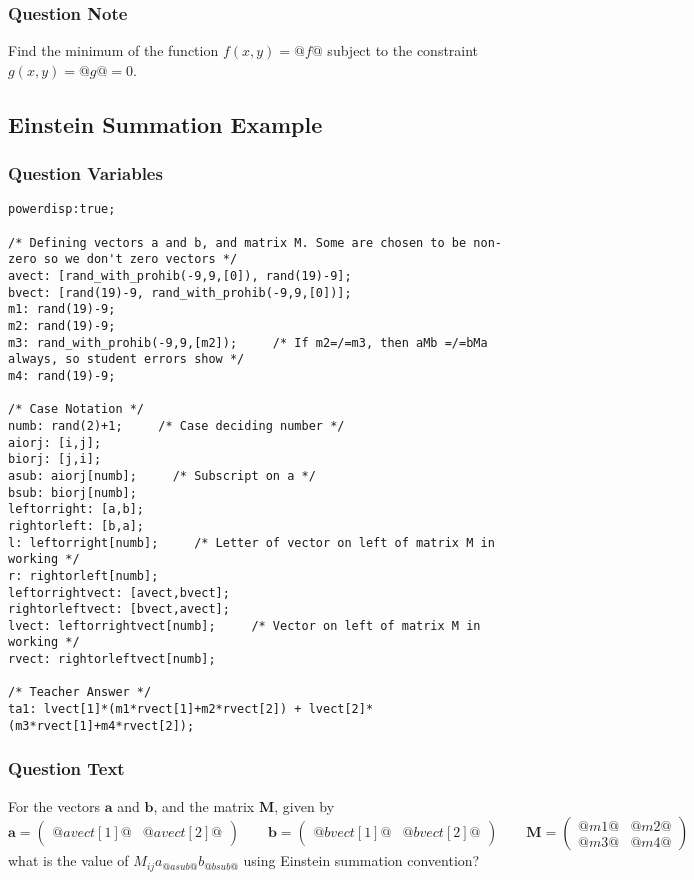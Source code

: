 \documentclass[a4paper,10pt]{article}
\begin{document}
\subsubsection{Question Note}
Find the minimum of the function \(f(x,y) = @f@\) subject to the constraint \(g(x,y) = @g@ = 0\).

\subsection{Einstein Summation Example}
\subsubsection{Question Variables}
\begin{lstlisting}
powerdisp:true;

/* Defining vectors a and b, and matrix M. Some are chosen to be non-zero so we don't zero vectors */
avect: [rand_with_prohib(-9,9,[0]), rand(19)-9];
bvect: [rand(19)-9, rand_with_prohib(-9,9,[0])];
m1: rand(19)-9;
m2: rand(19)-9;
m3: rand_with_prohib(-9,9,[m2]);     /* If m2=/=m3, then aMb =/=bMa always, so student errors show */
m4: rand(19)-9;

/* Case Notation */
numb: rand(2)+1;     /* Case deciding number */
aiorj: [i,j];
biorj: [j,i];
asub: aiorj[numb];     /* Subscript on a */
bsub: biorj[numb];
leftorright: [a,b];
rightorleft: [b,a];
l: leftorright[numb];     /* Letter of vector on left of matrix M in working */
r: rightorleft[numb];
leftorrightvect: [avect,bvect];
rightorleftvect: [bvect,avect];
lvect: leftorrightvect[numb];     /* Vector on left of matrix M in working */
rvect: rightorleftvect[numb];

/* Teacher Answer */
ta1: lvect[1]*(m1*rvect[1]+m2*rvect[2]) + lvect[2]*(m3*rvect[1]+m4*rvect[2]);
\end{lstlisting}
\subsubsection{Question Text}
For the vectors \(\textbf{a}\) and \(\textbf{b}\), and the matrix \(\textbf{M}\), given by \[ \textbf{a} = \left(\begin{matrix} @avect[1]@ & @avect[2]@ \end{matrix}\right) \qquad \textbf{b} = \left(\begin{matrix} @bvect[1]@ & @bvect[2]@ \end{matrix}\right) \qquad \textbf{M} = \left( \begin{matrix} @m1@ & @m2@ \\ @m3@ & @m4@ \end{matrix} \right) \] what is the value of \(M_{ij}a_{@asub@}b_{@bsub@}\) using Einstein summation convention? 
\end{document}
